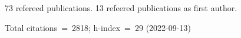 73 refereed publications. 13 refeered publications as first author.

Total citations~=~2818; h-index~=~29 (2022-09-13)